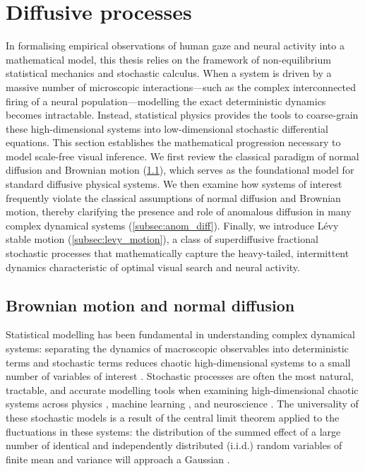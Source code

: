 \section{Diffusive processes}\label{sec:diffusive_processes}
In formalising empirical observations of human gaze and neural activity into a mathematical model, this thesis relies on the framework of non-equilibrium statistical mechanics and stochastic calculus. When a system is driven by a massive number of microscopic interactions—such as the complex interconnected firing of a neural population—modelling the exact deterministic dynamics becomes intractable. Instead, statistical physics provides the tools to coarse-grain these high-dimensional systems into low-dimensional stochastic differential equations. This section establishes the mathematical progression necessary to model scale-free visual inference. We first review the classical paradigm of normal diffusion and Brownian motion (\cref{subsec:brownian_motion}), which serves as the foundational model for standard diffusive physical systems. We then examine how systems of interest frequently violate the classical assumptions of normal diffusion and Brownian motion, thereby clarifying the presence and role of anomalous diffusion in many complex dynamical systems (\cref{subsec:anom_diff}). Finally, we introduce Lévy stable motion (\cref{subsec:levy_motion}), a class of superdiffusive fractional stochastic processes that mathematically capture the heavy-tailed, intermittent dynamics characteristic of optimal visual search and neural activity.
\subsection{Brownian motion and normal diffusion}\label{subsec:brownian_motion}
Statistical modelling has been fundamental in understanding complex dynamical systems: separating the dynamics of macroscopic observables into deterministic terms and stochastic terms reduces chaotic high-dimensional systems to a small number of variables of interest \cite{hassler_stochastic_2016, cunchala2024basicoverviewvariousstochastic}. Stochastic processes are often the most natural, tractable, and accurate modelling tools when examining high-dimensional chaotic systems across physics \cite{leroux_random_2021, Einstein1905, uhlenbeck1930theory}, machine learning \cite{cunchala2024basicoverviewvariousstochastic, surjanovic_autosgd_2025, chen_anomalous_2022}, and neuroscience \cite{orban_neural_2016, delacour_neural_1997, NIPS2002_a486cd07}. The universality of these stochastic models is a result of the central limit theorem applied to the fluctuations in these systems: the distribution of the summed effect of a large number of identical and independently distributed (i.i.d.) random variables of finite mean and variance will approach a Gaussian \cite{ulyanov2024classical, heyde1978central, gnedenko1954limit}.

